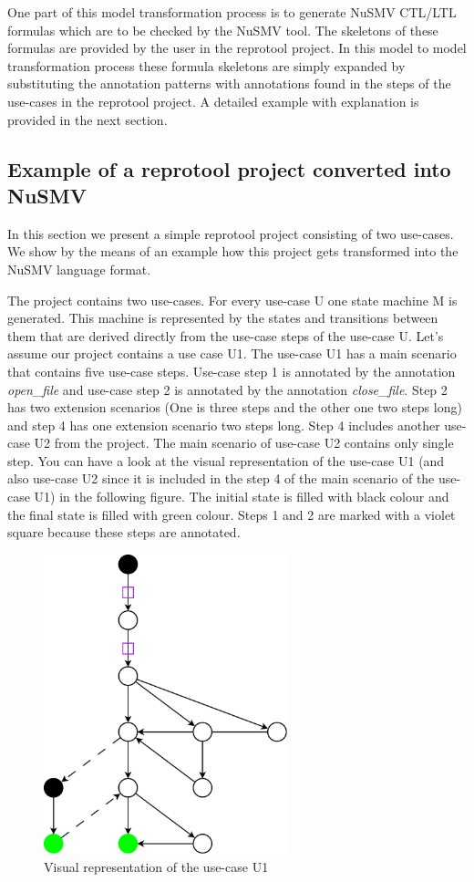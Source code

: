One part of this model transformation process is to generate NuSMV CTL/LTL formulas which are to be checked by the NuSMV tool. The
skeletons of these formulas are provided by the user in the reprotool project. In this model to model transformation process these
formula skeletons are simply expanded by substituting the annotation patterns with annotations found in the steps of the use-cases
in the reprotool project. A detailed example with explanation is provided in the next section.

\subsection{Example of a reprotool project converted into NuSMV}

In this section we present a simple reprotool project consisting of two use-cases. We show by the means of an example how this project
gets transformed into the NuSMV language format.

The project contains two use-cases. For every use-case U one state machine M is generated. This machine is represented by the states and
transitions between them that are derived directly from the use-case steps of the use-case U. Let's assume our project contains a use
case U1. The use-case U1 has a main scenario that contains five use-case steps. Use-case step 1 is annotated by the annotation \emph{open\_file}
and use-case step 2 is annotated by the annotation \emph{close\_file}. Step 2 has two extension scenarios (One is three steps and the other
one two steps long) and step 4 has one extension scenario two steps long. Step 4 includes another use-case U2 from the project. The
main scenario of use-case U2 contains only single step. You can have a look at the visual representation of the use-case U1 (and also
use-case U2 since it is included in the step 4 of the main scenario of the use-case U1) in the following figure. The initial state is
filled with black colour and the final state is filled with green colour. Steps 1 and 2 are marked with a violet square because these
steps are annotated.

\begin{figure}[ht]
  \centering
  \includegraphics[width=200pt]{images/u1}
  \caption{Visual representation of the use-case U1}
  \label{fig:use-case U1}
\end{figure}

